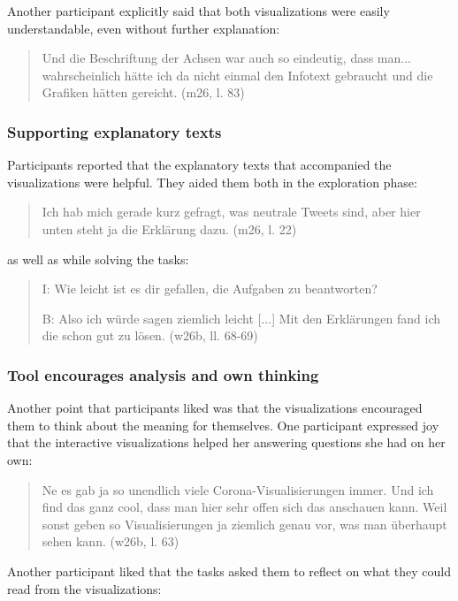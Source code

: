 Another participant explicitly said that both visualizations were easily understandable, even without further explanation:

\begin{quote}
    Und die Beschriftung der Achsen war auch so eindeutig, dass man... wahrscheinlich hätte ich da nicht einmal den Infotext gebraucht und die Grafiken hätten gereicht. (m26, l. 83)
\end{quote}

\subsubsection*{Supporting explanatory texts}
Participants reported that the explanatory texts that accompanied the visualizations were helpful. They aided them both in the exploration phase:

\begin{quote}
    Ich hab mich gerade kurz gefragt, was neutrale Tweets sind, aber hier unten steht ja die Erklärung dazu. (m26, l. 22)
\end{quote}

as well as while solving the tasks:

\begin{quote}
    I: Wie leicht ist es dir gefallen, die Aufgaben zu beantworten?

    B: Also ich würde sagen ziemlich leicht [...] Mit den Erklärungen fand ich die schon gut zu lösen. (w26b, ll. 68-69)
\end{quote}

\subsubsection*{Tool encourages analysis and own thinking}
Another point that participants liked was that the visualizations encouraged them to think about the meaning for themselves. One participant expressed joy that the interactive visualizations helped her answering questions she had on her own:

\begin{quote}
    Ne es gab ja so unendlich viele Corona-Visualisierungen immer. Und ich find das ganz cool, dass man hier sehr offen sich das anschauen kann. Weil sonst geben so Visualisierungen ja ziemlich genau vor, was man überhaupt sehen kann. (w26b, l. 63)
\end{quote}

Another participant liked that the tasks asked them to reflect on what they could read from the visualizations:

